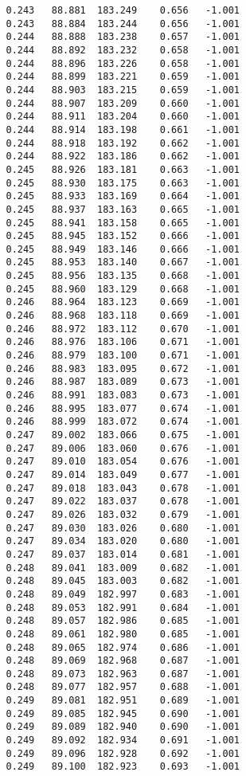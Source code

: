 \begin{verbatim}
   0.243   88.881  183.249    0.656   -1.001
   0.243   88.884  183.244    0.656   -1.001
   0.244   88.888  183.238    0.657   -1.001
   0.244   88.892  183.232    0.658   -1.001
   0.244   88.896  183.226    0.658   -1.001
   0.244   88.899  183.221    0.659   -1.001
   0.244   88.903  183.215    0.659   -1.001
   0.244   88.907  183.209    0.660   -1.001
   0.244   88.911  183.204    0.660   -1.001
   0.244   88.914  183.198    0.661   -1.001
   0.244   88.918  183.192    0.662   -1.001
   0.244   88.922  183.186    0.662   -1.001
   0.245   88.926  183.181    0.663   -1.001
   0.245   88.930  183.175    0.663   -1.001
   0.245   88.933  183.169    0.664   -1.001
   0.245   88.937  183.163    0.665   -1.001
   0.245   88.941  183.158    0.665   -1.001
   0.245   88.945  183.152    0.666   -1.001
   0.245   88.949  183.146    0.666   -1.001
   0.245   88.953  183.140    0.667   -1.001
   0.245   88.956  183.135    0.668   -1.001
   0.245   88.960  183.129    0.668   -1.001
   0.246   88.964  183.123    0.669   -1.001
   0.246   88.968  183.118    0.669   -1.001
   0.246   88.972  183.112    0.670   -1.001
   0.246   88.976  183.106    0.671   -1.001
   0.246   88.979  183.100    0.671   -1.001
   0.246   88.983  183.095    0.672   -1.001
   0.246   88.987  183.089    0.673   -1.001
   0.246   88.991  183.083    0.673   -1.001
   0.246   88.995  183.077    0.674   -1.001
   0.246   88.999  183.072    0.674   -1.001
   0.247   89.002  183.066    0.675   -1.001
   0.247   89.006  183.060    0.676   -1.001
   0.247   89.010  183.054    0.676   -1.001
   0.247   89.014  183.049    0.677   -1.001
   0.247   89.018  183.043    0.678   -1.001
   0.247   89.022  183.037    0.678   -1.001
   0.247   89.026  183.032    0.679   -1.001
   0.247   89.030  183.026    0.680   -1.001
   0.247   89.034  183.020    0.680   -1.001
   0.247   89.037  183.014    0.681   -1.001
   0.248   89.041  183.009    0.682   -1.001
   0.248   89.045  183.003    0.682   -1.001
   0.248   89.049  182.997    0.683   -1.001
   0.248   89.053  182.991    0.684   -1.001
   0.248   89.057  182.986    0.685   -1.001
   0.248   89.061  182.980    0.685   -1.001
   0.248   89.065  182.974    0.686   -1.001
   0.248   89.069  182.968    0.687   -1.001
   0.248   89.073  182.963    0.687   -1.001
   0.248   89.077  182.957    0.688   -1.001
   0.249   89.081  182.951    0.689   -1.001
   0.249   89.085  182.945    0.690   -1.001
   0.249   89.089  182.940    0.690   -1.001
   0.249   89.092  182.934    0.691   -1.001
   0.249   89.096  182.928    0.692   -1.001
   0.249   89.100  182.923    0.693   -1.001

\end{verbatim}
